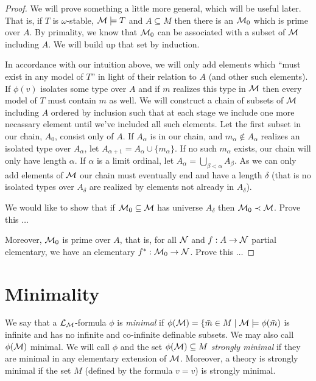 \begin{proof}\label{proof_omst_prime} 
We will prove something a little more general, which will be useful later.
That is, if \(T\) is \(\omega\)-stable, \(\mathcal{M} \models T\) and \(A \subseteq M\) then there is an \(\mathcal{M}_0\) which is prime over \(A\). 
By primality, we know that \(\mathcal{M}_0\) can be associated with a subset of \(\mathcal{M}\) including \(A\). 
We will build up that set by induction. 

In accordance with our intuition above, we will only add elements which ``must exist in any model of \(T\)'' in light of their relation to \(A\) (and other such elements).
If \(\phi(v)\) isolates some type over \(A\) and if \(m\) realizes this type in \(\mathcal{M}\) then every model of \(T\) must contain \(m\) as well. 
We will construct a chain of subsets of \(\mathcal{M}\) including \(A\) ordered by inclusion such that at each stage we include one more necassary element until we've included all such elements. 
Let the first subset in our chain, \(A_0\), consist only of \(A\). 
If \(A_\alpha\) is in our chain, and \(m_\alpha \notin A_\alpha\) realizes an isolated type over \(A_\alpha\), let \(A_{\alpha+1} = A_\alpha \cup \{m_\alpha\}\).
If no such \(m_\alpha\) exists, our chain will only have length \(\alpha\). 
If \(\alpha\) is a limit ordinal, let \(A_\alpha = \bigcup_{\beta < \alpha} A_\beta\). 
As we can only add elements of \(\mathcal{M}\) our chain must eventually end and have a length \(\delta\) (that is no isolated types over \(A_\delta\) are realized by elements not already in \(A_\delta\)).

We would like to show that if \(\mathcal{M}_0 \subseteq \mathcal{M}\) has universe \(A_\delta\) then \(\mathcal{M}_0 \prec \mathcal{M}\).
{\color{red}Prove this \(\ldots\)}

Moreover, \(\mathcal{M}_0\) is prime over \(A\), that is, for all \(\mathcal{N}\) and \(f: A \to \mathcal{N}\) partial elementary, we have an elementary \(f^*: \mathcal{M}_0 \to \mathcal{N}\). 
{\color{red}Prove this \(\ldots\)}
\end{proof}

\section{Minimality}

\begin{definition}\label{definition_minimality}
We say that a \(\mathcal{L}_{\mathcal{M}}\)-formula \(\phi\) is \textit{minimal} if \(\phi(\mathcal{M}) = \{\bar{m} \in M \mid \mathcal{M} \models \phi(\bar{m})\) is infinite and has no infinite and co-infinite definable subsets. 
We may also call \(\phi(\mathcal{M})\) minimal. 
We will call \(\phi\) and the set \(\phi(\mathcal{M}) \subseteq M\) %
\textit{strongly minimal} if they are minimal in any elementary extension of \(\mathcal{M}\).
Moreover, a theory is strongly minimal if the set \(M\) (defined by the formula \(v = v\)) is strongly minimal. 
\end{definition}

